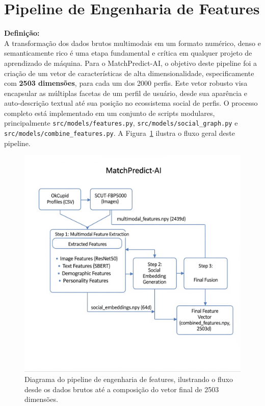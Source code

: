 \section{Pipeline de Engenharia de Features}
\label{sec:dev_pipeline_features}

\sloppy

\textbf{Definição:} \\
A transformação dos dados brutos multimodais em um formato numérico, denso e semanticamente rico é uma etapa fundamental e crítica em qualquer projeto de aprendizado de máquina. Para o MatchPredict-AI, o objetivo deste pipeline foi a criação de um vetor de características de alta dimensionalidade, especificamente com \textbf{2503 dimensões}, para cada um dos 2000 perfis. Este vetor robusto visa encapsular as múltiplas facetas de um perfil de usuário, desde sua aparência e auto-descrição textual até sua posição no ecossistema social de perfis. O processo completo está implementado em um conjunto de scripts modulares, principalmente \texttt{src/models/features.py}, \texttt{src/models/social\_graph.py} e \texttt{src/models/combine\_features.py}. A Figura~\ref{fig:pipeline_dados_tcc2} ilustra o fluxo geral deste pipeline.

\begin{figure}[h!]
    \centering
    \includegraphics[width=\textwidth]{imagens/diagrama_pipeline.png}
    \caption{Diagrama do pipeline de engenharia de features, ilustrando o fluxo desde os dados brutos até a composição do vetor final de 2503 dimensões.}
    \label{fig:pipeline_dados_tcc2}
\end{figure}

